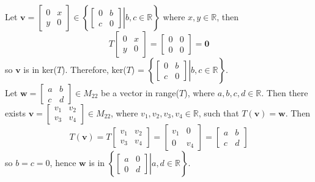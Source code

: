 Let $\textbf{v} = \begin{bmatrix}
	0 & x \\ y & 0
\end{bmatrix} \in \left\lbrace\left.\begin{bmatrix}
0 & b \\ c & 0
\end{bmatrix} \right\vert b, c \in \mathbb{R} \right\rbrace$ where $x, y \in \mathbb{R}$, then \begin{equation*}
	T\begin{bmatrix}
	0 & x \\ y & 0
	\end{bmatrix} = \begin{bmatrix}
		0 & 0 \\ 0 & 0
	\end{bmatrix} = \textbf{0}
\end{equation*} so $\textbf{v}$ is in ker($T$). Therefore, ker($T$) = $\left\lbrace\left.\begin{bmatrix}
0 & b \\ c & 0
\end{bmatrix} \right\vert b, c \in \mathbb{R} \right\rbrace$. \\

Let $\textbf{w} = \begin{bmatrix}
	a & b \\ c & d
\end{bmatrix} \in M_{22}$ be a vector in range($T$), where $a, b, c, d \in \mathbb{R}$. Then there exists $\textbf{v} = \begin{bmatrix}
	v_1 & v_2 \\ v_3 & v_4
\end{bmatrix} \in M_{22}$, where $v_1, v_2, v_3, v_4 \in \mathbb{R}$, such that $T(\textbf{v}) = \textbf{w}$. Then \begin{equation*}
	T(\textbf{v}) = T\begin{bmatrix}
	v_1 & v_2 \\ v_3 & v_4
	\end{bmatrix} = \begin{bmatrix}
	v_1 & 0 \\ 0 & v_4
	\end{bmatrix} = \begin{bmatrix}
	a & b \\ c & d
	\end{bmatrix}
\end{equation*} so $b = c = 0$, hence $\textbf{w}$ is in $\left\lbrace\left.\begin{bmatrix}
a & 0 \\ 0 & d
\end{bmatrix} \right\vert a, d \in \mathbb{R} \right\rbrace$. \\

